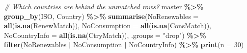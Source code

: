 \documentclass[
]{article}
\newenvironment{Shaded}{\begin{snugshade}}{\end{snugshade}}
\newcommand{\AttributeTok}[1]{\textcolor[rgb]{0.13,0.29,0.53}{#1}}
\newcommand{\CommentTok}[1]{\textcolor[rgb]{0.56,0.35,0.01}{\textit{#1}}}
\newcommand{\DecValTok}[1]{\textcolor[rgb]{0.00,0.00,0.81}{#1}}
\newcommand{\FunctionTok}[1]{\textcolor[rgb]{0.13,0.29,0.53}{\textbf{#1}}}
\newcommand{\NormalTok}[1]{#1}
\newcommand{\SpecialCharTok}[1]{\textcolor[rgb]{0.81,0.36,0.00}{\textbf{#1}}}
\newcommand{\StringTok}[1]{\textcolor[rgb]{0.31,0.60,0.02}{#1}}
\begin{document}
\begin{Shaded}
\begin{Highlighting}[]
\CommentTok{\# Which countries are behind the unmatched rows?}
\NormalTok{master }\SpecialCharTok{\%\textgreater{}\%}
  \FunctionTok{group\_by}\NormalTok{(ISO, Country) }\SpecialCharTok{\%\textgreater{}\%}
  \FunctionTok{summarise}\NormalTok{(}\AttributeTok{NoRenewables =} \FunctionTok{all}\NormalTok{(}\FunctionTok{is.na}\NormalTok{(RenewMatch)),}
            \AttributeTok{NoConsumption =} \FunctionTok{all}\NormalTok{(}\FunctionTok{is.na}\NormalTok{(ConsMatch)),}
            \AttributeTok{NoCountryInfo =} \FunctionTok{all}\NormalTok{(}\FunctionTok{is.na}\NormalTok{(CtryMatch)), }\AttributeTok{.groups =} \StringTok{"drop"}\NormalTok{) }\SpecialCharTok{\%\textgreater{}\%}
  \FunctionTok{filter}\NormalTok{(NoRenewables }\SpecialCharTok{|}\NormalTok{ NoConsumption }\SpecialCharTok{|}\NormalTok{ NoCountryInfo) }\SpecialCharTok{\%\textgreater{}\%}
  \FunctionTok{print}\NormalTok{(}\AttributeTok{n =} \DecValTok{30}\NormalTok{)}
\end{Highlighting}
\end{Shaded}
\end{document}
